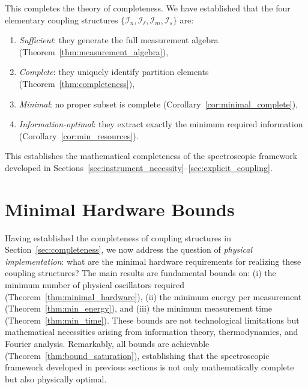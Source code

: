 \documentclass[twocolumn,10pt,a4paper]{article}
\theoremstyle{remark}
\begin{document}
This completes the theory of completeness. We have established that the four elementary coupling structures $\{\mathcal{I}_n, \mathcal{I}_\ell, \mathcal{I}_m, \mathcal{I}_s\}$ are:
\begin{enumerate}[label=(\alph*), noitemsep]
    \item \emph{Sufficient}: they generate the full measurement algebra (Theorem~\ref{thm:measurement_algebra}),
    \item \emph{Complete}: they uniquely identify partition elements (Theorem~\ref{thm:completeness}),
    \item \emph{Minimal}: no proper subset is complete (Corollary~\ref{cor:minimal_complete}),
    \item \emph{Information-optimal}: they extract exactly the minimum required information (Corollary~\ref{cor:min_resources}).
\end{enumerate}

This establishes the mathematical completeness of the spectroscopic framework developed in Sections~\ref{sec:instrument_necessity}--\ref{sec:explicit_coupling}.

\section{Minimal Hardware Bounds}
\label{sec:hardware_bounds}

Having established the completeness of coupling structures in Section~\ref{sec:completeness}, we now address the question of \emph{physical implementation}: what are the minimal hardware requirements for realizing these coupling structures? The main results are fundamental bounds on: (i) the minimum number of physical oscillators required (Theorem~\ref{thm:minimal_hardware}), (ii) the minimum energy per measurement (Theorem~\ref{thm:min_energy}), and (iii) the minimum measurement time (Theorem~\ref{thm:min_time}). These bounds are not technological limitations but mathematical necessities arising from information theory, thermodynamics, and Fourier analysis. Remarkably, all bounds are achievable (Theorem~\ref{thm:bound_saturation}), establishing that the spectroscopic framework developed in previous sections is not only mathematically complete but also physically optimal.
\end{document}
